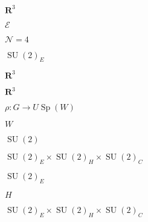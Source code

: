\begin{preview}
\setcounter{equation}{0}%
\( \mathbf{R}^3 \)
\end{preview}

\begin{preview}
\setcounter{equation}{0}%
\( \mathcal{E} \)
\end{preview}

\begin{preview}
\setcounter{equation}{0}%
\( \mathcal{N}=4 \)
\end{preview}

\begin{preview}
\setcounter{equation}{0}%
\( \operatorname{SU}(2)_E \)
\end{preview}

\begin{preview}
\setcounter{equation}{0}%
\( \mathbf{R}^3 \)
\end{preview}

\begin{preview}
\setcounter{equation}{0}%
\( \mathbf{R}^3 \)
\end{preview}

\begin{preview}
\setcounter{equation}{0}%
\( \rho : G \to U \operatorname{Sp}(W) \)
\end{preview}

\begin{preview}
\setcounter{equation}{0}%
\( W \)
\end{preview}

\begin{preview}
\setcounter{equation}{0}%
\( \operatorname{SU}(2) \)
\end{preview}

\begin{preview}
\setcounter{equation}{0}%
\(  \operatorname{SU}(2)_E \times  \operatorname{SU}(2)_H \times  \operatorname{SU}(2)_C  \)
\end{preview}

\begin{preview}
\setcounter{equation}{0}%
\( \operatorname{SU}(2)_E \)
\end{preview}

\begin{preview}
\setcounter{equation}{0}%
\( H \)
\end{preview}

\begin{preview}
\setcounter{equation}{0}%
\( \operatorname{SU}(2)_E \times  \operatorname{SU}(2)_H \times  \operatorname{SU}(2)_C \)
\end{preview}

